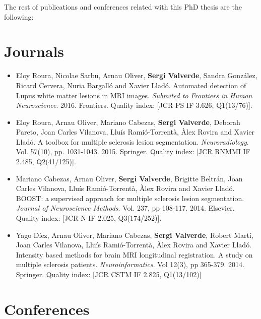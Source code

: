 The rest of publications and conferences related with this PhD thesis are the following:

\section*{Journals}

\begin{itemize}

\item Eloy Roura, Nicolae Sarbu, Arnau Oliver, \textbf{Sergi Valverde}, Sandra Gonz\'{a}lez, Ricard Cervera, Nuria Bargall\'{o} and Xavier Llad\'{o}. Automated detection of Lupus white matter lesions in MRI images. \textit{Submited to Frontiers in Human Neuroscience}. 2016. Frontiers.  Quality index: [JCR PS IF 3.626, Q1(13/76)].

\item Eloy Roura, Arnau Oliver, Mariano Cabezas, \textbf{Sergi Valverde}, Deborah Pareto, Joan Carles Vilanova, Llu\'{i}s Rami\'{o}-Torrent\`{a}, \`{A}lex Rovira and Xavier Llad\'{o}. A toolbox for multiple sclerosis lesion segmentation. \textit{Neuroradiology}. Vol. 57(10),  pp. 1031-1043. 2015. Springer.  Quality index: [JCR RNMMI IF 2.485, Q2(41/125)].

\item Mariano Cabezas, Arnau Oliver, \textbf{Sergi Valverde}, Brigitte Beltr\'{a}n, Joan Carles Vilanova, Llu\'{i}s Rami\'{o}-Torrent\`{a}, \`{A}lex Rovira and Xavier Llad\'{o}. BOOST: a supervised approach for multiple sclerosis lesion segmentation. \textit{Journal of Neuroscience Methods}. Vol. 237, pp 108-117. 2014. Elsevier.  Quality index: [JCR N IF 2.025, Q3(174/252)].

\item Yago D\'{i}ez, Arnau Oliver, Mariano Cabezas, \textbf{Sergi Valverde}, Robert Mart\'{i}, Joan Carles Vilanova, Llu\'{i}s Rami\'{o}-Torrent\`{a}, \`{A}lex Rovira and Xavier Llad\'{o}. Intensity based methods for brain MRI longitudinal registration. A study on multiple sclerosis patients. \textit{Neuroinformatics}. Vol 12(3), pp 365-379. 2014. Springer.  Quality index: [JCR CSTM IF 2.825, Q1(13/102)] 

\end{itemize}


\section*{Conferences}

